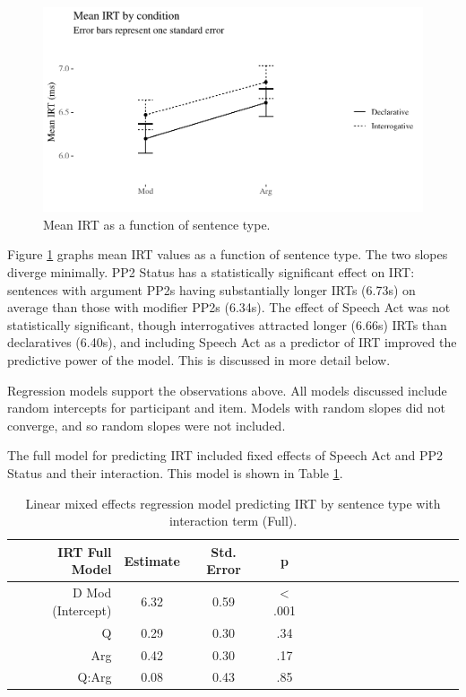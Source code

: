 \documentclass[11pt,oneside]{book}
\begin{document}
\begin{figure}
\centering
\includegraphics{4-results_files/figure-latex/interactionplot-1.pdf}
\caption{\label{fig:interactionplot}Mean IRT as a function of sentence type.}
\end{figure}

Figure \ref{fig:interactionplot} graphs mean IRT values as a function of sentence type. The two slopes diverge minimally. PP2 Status has a statistically significant effect on IRT: sentences with argument PP2s having substantially longer IRTs (6.73s) on average than those with modifier PP2s (6.34s). The effect of Speech Act was not statistically significant, though interrogatives attracted longer (6.66s) IRTs than declaratives (6.40s), and including Speech Act as a predictor of IRT improved the predictive power of the model. This is discussed in more detail below.

Regression models support the observations above. All models discussed include random intercepts for participant and item. Models with random slopes did not converge, and so random slopes were not included.

The full model for predicting IRT included fixed effects of Speech Act and PP2 Status and their interaction. This model is shown in Table \ref{tab:hyp}.

\begin{table}[!h]

\caption{\label{tab:hyp}Linear mixed effects regression model predicting IRT by sentence type with interaction term (Full).}
\centering
\begin{tabular}{rcccrcccrcccrccc}
\toprule
IRT Full Model & Estimate & Std. Error & p\\
\midrule
D Mod (Intercept) & 6.32 & 0.59 & < .001\\
Q & 0.29 & 0.30 & .34\\
Arg & 0.42 & 0.30 & .17\\
Q:Arg & 0.08 & 0.43 & .85\\
\bottomrule
\end{tabular}
\end{table}
\end{document}
